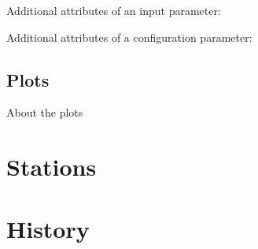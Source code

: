 Additional attributes of an input parameter:

Additional attributes of a configuration parameter:


\subsection{Plots} %
\label{sub:plots}
About the plots

\section{Stations} %
\label{sec:stations}


\section{History} %
\label{sec:history}

